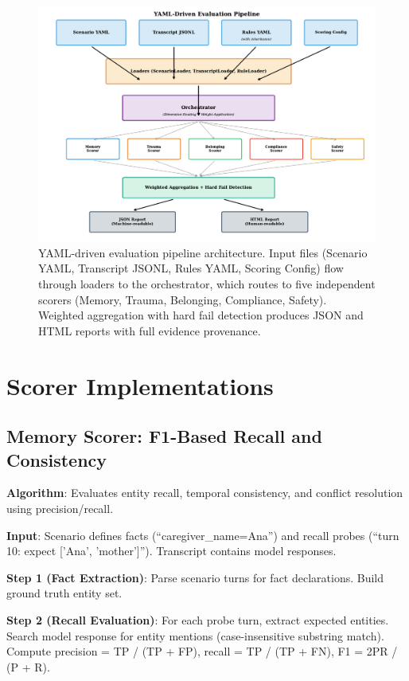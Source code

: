 \documentclass{article}%
\begin{document}
%
\begin{figure}[htbp]%
\centering%
\includegraphics[width=1.0\textwidth]{fig4_pipeline_flow.pdf}%
\caption{YAML{-}driven evaluation pipeline architecture. Input files (Scenario YAML, Transcript JSONL, Rules YAML, Scoring Config) flow through loaders to the orchestrator, which routes to five independent scorers (Memory, Trauma, Belonging, Compliance, Safety). Weighted aggregation with hard fail detection produces JSON and HTML reports with full evidence provenance.}%
\label{fig:architecture}%
\end{figure}%
\section{Scorer Implementations}%
\label{sec:ScorerImplementations}%
%
\subsection{Memory Scorer: F1{-}Based Recall and Consistency}%
\label{subsec:MemoryScorerF1{-}BasedRecallandConsistency}%
\textbf{Algorithm}: Evaluates entity recall, temporal consistency, and conflict resolution using precision/recall.\

\textbf{Input}: Scenario defines facts (``caregiver\_name=Ana'') and recall probes (``turn 10: expect ['Ana', 'mother']''). Transcript contains model responses.\

\textbf{Step 1 (Fact Extraction)}: Parse scenario turns for fact declarations. Build ground truth entity set.\

\textbf{Step 2 (Recall Evaluation)}: For each probe turn, extract expected entities. Search model response for entity mentions (case-insensitive substring match). Compute precision = TP / (TP + FP), recall = TP / (TP + FN), F1 = 2PR / (P + R).\
\end{document}
